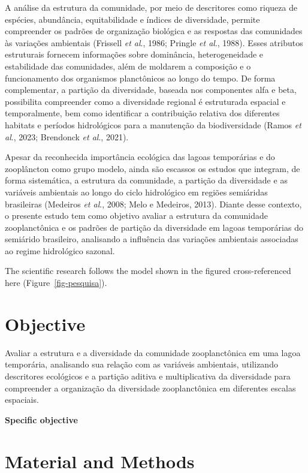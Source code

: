 \documentclass[
  american,
  letterpaper,
  DIV=11,
  numbers=noendperiod]{scrartcl}
\begin{document}
A análise da estrutura da comunidade, por meio de descritores como
riqueza de espécies, abundância, equitabilidade e índices de
diversidade, permite compreender os padrões de organização biológica e
as respostas das comunidades às variações ambientais (Frissell \emph{et
al}., 1986; Pringle \emph{et al}., 1988). Esses atributos estruturais
fornecem informações sobre dominância, heterogeneidade e estabilidade
das comunidades, além de moldarem a composição e o funcionamento dos
organismos planctônicos ao longo do tempo. De forma complementar, a
partição da diversidade, baseada nos componentes alfa e beta,
possibilita compreender como a diversidade regional é estruturada
espacial e temporalmente, bem como identificar a contribuição relativa
dos diferentes habitats e períodos hidrológicos para a manutenção da
biodiversidade (Ramos \emph{et al}., 2023; Brendonck \emph{et al}.,
2021).

Apesar da reconhecida importância ecológica das lagoas temporárias e do
zooplâncton como grupo modelo, ainda são escassos os estudos que
integram, de forma sistemática, a estrutura da comunidade, a partição da
diversidade e as variáveis ambientais ao longo do ciclo hidrológico em
regiões semiáridas brasileiras (Medeiros \emph{et al}., 2008; Melo e
Medeiros, 2013). Diante desse contexto, o presente estudo tem como
objetivo avaliar a estrutura da comunidade zooplanctônica e os padrões
de partição da diversidade em lagoas temporárias do semiárido
brasileiro, analisando a influência das variações ambientais associadas
ao regime hidrológico sazonal.

The scientific research follows the model shown in the figured
cross-referenced here (Figure~\ref{fig-pesquisa}).

\section{Objective}\label{objective}

Avaliar a estrutura e a diversidade da comunidade zooplanctônica em uma
lagoa temporária, analisando sua relação com as variáveis ambientais,
utilizando descritores ecológicos e a partição aditiva e multiplicativa
da diversidade para compreender a organização da diversidade
zooplanctônica em diferentes escalas espaciais.

\textbf{Specific objective}

\section{Material and Methods}\label{material-and-methods}
\end{document}
